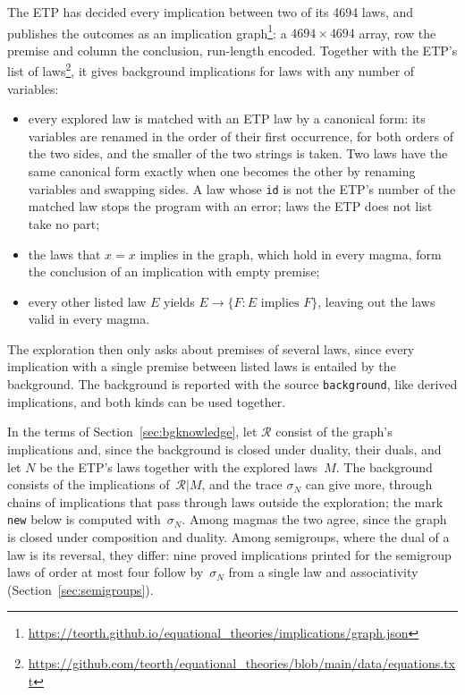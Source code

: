 \documentclass[11pt,a4paper]{article}
\theoremstyle{definition}
\theoremstyle{remark}
\newcommand{\code}[1]{\texttt{#1}}
\begin{document}
The ETP has decided every implication between two of its 4694 laws, and publishes the outcomes as an implication graph\footnote{\url{https://teorth.github.io/equational_theories/implications/graph.json}}: a $4694 \times 4694$ array, row the premise and column the conclusion, run-length encoded. Together with the ETP's list of laws\footnote{\url{https://github.com/teorth/equational_theories/blob/main/data/equations.txt}}, it gives background implications for laws with any number of variables:
\begin{itemize}
  \item every explored law is matched with an ETP law by a canonical form: its variables are renamed in the order of their first occurrence, for both orders of the two sides, and the smaller of the two strings is taken. Two laws have the same canonical form exactly when one becomes the other by renaming variables and swapping sides. A law whose \code{id} is not the ETP's number of the matched law stops the program with an error; laws the ETP does not list take no part;
  \item the laws that $x = x$ implies in the graph, which hold in every magma, form the conclusion of an implication with empty premise;
  \item every other listed law $E$ yields $E \to \{F : E \text{ implies } F\}$, leaving out the laws valid in every magma.
\end{itemize}
The exploration then only asks about premises of several laws, since every implication with a single premise between listed laws is entailed by the background. The background is reported with the source \code{background}, like derived implications, and both kinds can be used together.

In the terms of Section~\ref{sec:bgknowledge}, let $\mathcal{R}$ consist of the graph's implications and, since the background is closed under duality, their duals, and let $N$ be the ETP's laws together with the explored laws~$M$. The background consists of the implications of~$\mathcal{R}|M$, and the trace $\sigma_N$ can give more, through chains of implications that pass through laws outside the exploration; the mark \code{new} below is computed with~$\sigma_N$. Among magmas the two agree, since the graph is closed under composition and duality. Among semigroups, where the dual of a law is its reversal, they differ: nine proved implications printed for the semigroup laws of order at most four follow by~$\sigma_N$ from a single law and associativity (Section~\ref{sec:semigroups}).
\end{document}
